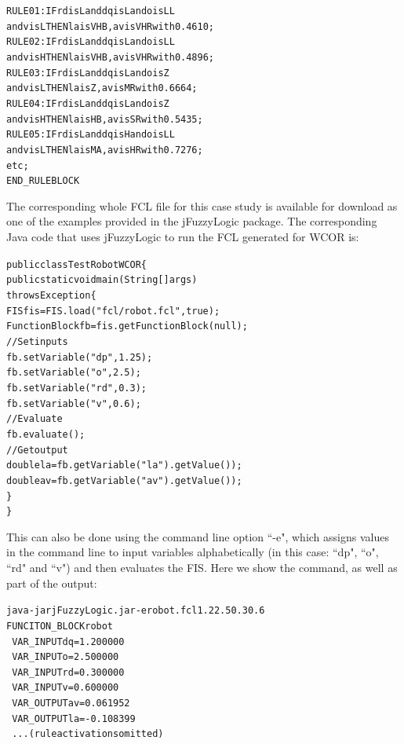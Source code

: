 \documentclass[11pt,twoside]{article}
\begin{document}
\begin{multicols}{2}
\begin{scriptsize}
\begin{alltt}
RULE 01: IF rd is  L and dq is L and o is LL 
    and v is L THEN la is VHB , av is VHR with 0.4610;
RULE 02: IF rd is  L and dq is L and o is LL 
    and v is H THEN la is VHB , av is VHR with 0.4896;
RULE 03: IF rd is  L and dq is L and o is  Z 
    and v is L THEN la is   Z , av is  MR with 0.6664;
RULE 04: IF rd is  L and dq is L and o is  Z 
    and v is H THEN la is  HB , av is  SR with 0.5435;
RULE 05: IF rd is  L and dq is H and o is LL 
    and v is L THEN la is  MA , av is  HR with 0.7276;
etc;
END\_RULEBLOCK
\end{alltt}
\end{scriptsize}
\vspace*{5pt}
The corresponding whole FCL file for this case study is available for download as one of the examples provided in the jFuzzyLogic package. The corresponding Java code that uses jFuzzyLogic to run the FCL generated for WCOR is:
\vspace*{5pt}
\begin{scriptsize}
\begin{alltt}
public class TestRobotWCOR \{
  public static void main(String[] args) 
  throws Exception \{
    FIS fis = FIS.load("fcl/robot.fcl", true);
    FunctionBlock fb = fis.getFunctionBlock(null);
    // Set inputs
    fb.setVariable("dp", 1.25);
    fb.setVariable("o", 2.5); 
    fb.setVariable("rd", 0.3); 
    fb.setVariable("v", 0.6);
    // Evaluate
    fb.evaluate(); 
    // Get output
    double la = fb.getVariable("la").getValue());
    double av = fb.getVariable("av").getValue());
  \}
\}
\end{alltt}
\end{scriptsize}
\vspace*{5pt}
This can also be done using the command line option ``-e", which assigns values in the command line to input variables alphabetically (in this case: ``dp", ``o", ``rd" and ``v") and then evaluates the FIS. Here we show the command, as well as part of the output:
\vspace*{5pt}
\begin{scriptsize}
\begin{alltt}
java -jar jFuzzyLogic.jar -e robot.fcl 1.2 2.5 0.3 0.6
\vspace*{3pt}
FUNCITON_BLOCK robot
\ 	VAR_INPUT 	        dq = 1.200000
\ 	VAR_INPUT 	         o = 2.500000
\ 	VAR_INPUT 	        rd = 0.300000
\ 	VAR_INPUT 	         v = 0.600000
\ 	VAR_OUTPUT	        av = 0.061952
\ 	VAR_OUTPUT	        la = -0.108399
\   ...(rule activations omitted)
\end{alltt}
\end{scriptsize}
\vspace*{5pt}


\end{multicols}
\end{document}
